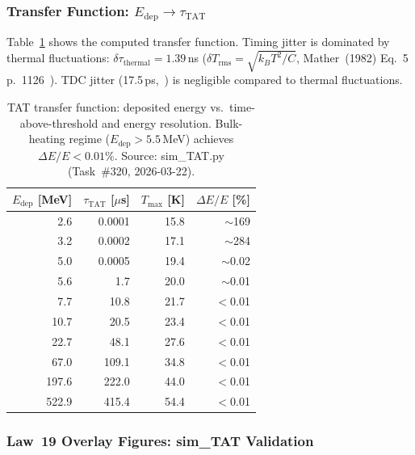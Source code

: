 \subsubsection{Transfer Function: $E_\mathrm{dep} \to \tau_\mathrm{TAT}$}
\label{sec:oq5_tat_transfer}

Table~\ref{tab:tat_transfer} shows the computed transfer function.
Timing jitter is dominated by thermal fluctuations:
$\delta\tau_\mathrm{thermal} = 1.39$\,ns
($\delta T_\mathrm{rms} = \sqrt{k_B T^2 / C}$,
Mather~(1982) Eq.~5 p.~1126~\cite{Mather1982}). %
TDC jitter (17.5\,ps,~\cite{Lim2025}) %
is negligible compared to thermal fluctuations.

\begin{table}[ht]
\centering
\caption{TAT transfer function: deposited energy vs.\ time-above-threshold and energy resolution.
Bulk-heating regime ($E_\mathrm{dep} > 5.5$\,MeV) achieves $\Delta E/E < 0.01\%$.
Source: sim\_TAT.py (Task~\#320, 2026-03-22).}
\label{tab:tat_transfer}
\small
\begin{tabular}{@{}rrrr@{}}
\toprule
$E_\mathrm{dep}$ [MeV] & $\tau_\mathrm{TAT}$ [$\mu$s] & $T_\mathrm{max}$ [K] & $\Delta E/E$ [\%] \\
\midrule
2.6  & 0.0001 & 15.8 & $\sim$169   \\
3.2  & 0.0002 & 17.1 & $\sim$284   \\
5.0  & 0.0005 & 19.4 & $\sim$0.02  \\
5.6  & 1.7    & 20.0 & $\sim$0.01  \\
7.7  & 10.8   & 21.7 & $<$0.01     \\
10.7 & 20.5   & 23.4 & $<$0.01     \\
22.7 & 48.1   & 27.6 & $<$0.01     \\
67.0 & 109.1  & 34.8 & $<$0.01     \\
197.6 & 222.0 & 44.0 & $<$0.01     \\
522.9 & 415.4 & 54.4 & $<$0.01     \\
\bottomrule
\end{tabular}
\end{table}

\subsubsection{Law~19 Overlay Figures: sim\_TAT Validation}
\label{sec:oq5_tat_law19}

